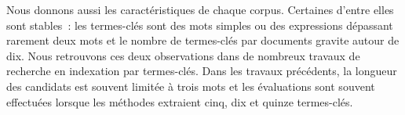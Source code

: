     Nous donnons aussi les caractéristiques de chaque corpus. Certaines d'entre
    elles sont stables~: les termes-clés sont des mots simples ou des
    expressions dépassant rarement deux mots et le nombre de termes-clés par
    documents gravite autour de dix. Nous retrouvons ces deux observations dans
    de nombreux travaux de recherche en indexation par termes-clés. Dans les
    travaux précédents, la longueur des candidats est souvent limitée à trois
    mots et les évaluations sont souvent effectuées lorsque les méthodes
    extraient cinq, dix et quinze termes-clés.

